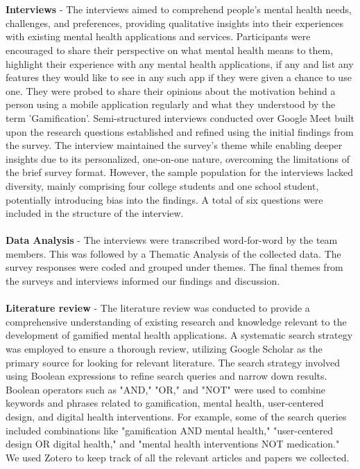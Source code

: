 \documentclass[manuscript,screen,review]{acmart}
\begin{document}
\\ \\ 
\textbf{Interviews} - The interviews aimed to comprehend people's mental health needs, challenges, and preferences, providing qualitative insights into their experiences with existing mental health applications and services. Participants were encouraged to share their perspective on what mental health means to them, highlight their experience with any mental health applications, if any and list any features they would like to see in any such app if they were given a chance to use one. They were probed to share their opinions about the motivation behind a person using a mobile application regularly and what they understood by the term 'Gamification'. Semi-structured interviews conducted over Google Meet built upon the research questions established and refined using the initial findings from the survey. The interview maintained the survey's theme while enabling deeper insights due to its personalized, one-on-one nature, overcoming the limitations of the brief survey format. However, the sample population for the interviews lacked diversity, mainly comprising four college students and one school student, potentially introducing bias into the findings. A total of six questions were included in the structure of the interview.
\\ \\
\textbf{Data Analysis} - The interviews were transcribed word-for-word by the team members. This was followed by a Thematic Analysis of the collected data. The survey responses were coded and grouped under themes. The final themes from the surveys and interviews informed our findings and discussion.
\\ \\
\textbf{Literature review} - The literature review was conducted to provide a comprehensive understanding of existing research and knowledge relevant to the development of gamified mental health applications. A systematic search strategy was employed to ensure a thorough review, utilizing Google Scholar as the primary source for looking for relevant literature. The search strategy involved using Boolean expressions to refine search queries and narrow down results. Boolean operators such as "AND," "OR," and "NOT" were used to combine keywords and phrases related to gamification, mental health, user-centered design, and digital health interventions. For example, some of the search queries included combinations like "gamification AND mental health," "user-centered design OR digital health," and "mental health interventions NOT medication." We used Zotero to keep track of all the relevant articles and papers we collected.
\end{document}
